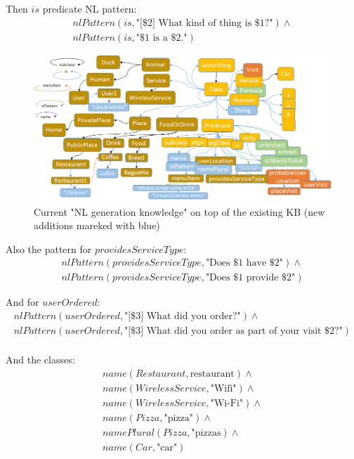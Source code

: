 Then $is$ predicate NL pattern:
\begin{equation}\label{as:nl:is}
\begin{gathered}
    nlPattern(is,\text{"[\$2] What kind of thing is \$1?"}) \land \\
    nlPattern(is,\text{"\$1 is a \$2."})
\end{gathered}
\end{equation}

\begin{figure}[H]
	\centering
		\includegraphics[width=1\textwidth]{figures/LogicToNLOntology.png}
	\caption{Current "NL generation knowledge" on top of the existing KB (new
    additions mareked with blue)}
	\label{fig:nlKB}
\end{figure}

Also the pattern for $providesServiceType$:
\begin{equation}\label{as:nl:providesServiceType}
\begin{gathered}
    nlPattern(providesServiceType,\text{"Does \$1 have \$2"}) \land \\
    nlPattern(providesServiceType,\text{"Does \$1 provide \$2"})
\end{gathered}
\end{equation}

And for $userOrdered$:
\begin{equation}\label{as:nl:userOrdered}
\begin{gathered}
    nlPattern(userOrdered,\text{"[\$3] What did you order?"}) \land \\
    nlPattern(userOrdered,\text{"[\$3] What did you order as part of your visit \$2?"}) \\
\end{gathered}
\end{equation}


And the classes:
\begin{equation}\label{as:nl:classes}
\begin{gathered}
    name(Restaurant, \text{restaurant}) \land \\
    name(WirelessService, \text{"Wifi"}) \land \\
    name(WirelessService, \text{"Wi-Fi"}) \land \\
	name(Pizza, \text{"pizza"}) \land \\
	namePlural(Pizza, \text{"pizzas}) \land \\
	name(Car, \text{"car"})
\end{gathered}
\end{equation}

